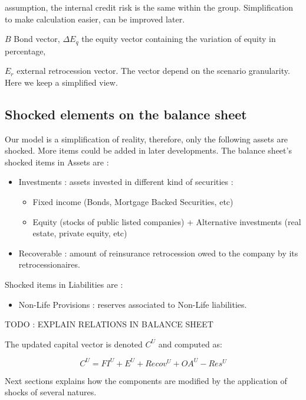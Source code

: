assumption, the internal credit risk is the same within the group. Simplification to make calculation easier, can be improved later.


$B$ Bond vector, $\Delta E_q$ the equity vector containing the variation of equity in percentage, 



$E_r$ external retrocession vector. The vector depend on the scenario granularity. Here we keep a simplified view.


\subsection{Shocked elements on the balance sheet}

Our model is a simplification of reality, therefore, only the following assets are shocked. More items could be added in later developments. The balance sheet's shocked items in Assets are :

\begin{itemize}
\itemsep0em 
\item Investments : assets invested in different kind of securities :
\begin{itemize}
\item Fixed income (Bonds, Mortgage Backed Securities, etc)
\item Equity (stocks of public listed companies) + Alternative investments (real estate, private equity, etc)
\end{itemize}
\item Recoverable : amount of reinsurance retrocession owed to the company by its retrocessionaires.
\end{itemize}

Shocked items in Liabilities are :
\begin{itemize}
\itemsep0em 
\item Non-Life Provisions : reserves associated to Non-Life liabilities.
\end{itemize}

TODO : EXPLAIN RELATIONS IN BALANCE SHEET

The updated capital vector is denoted $C^U$ and computed as:

\begin{equation}
    C^U = FI^U + E^U + Recov^U + OA^U - Res^U
\end{equation}

Next sections explains how the components are modified by the application of shocks of several natures.


